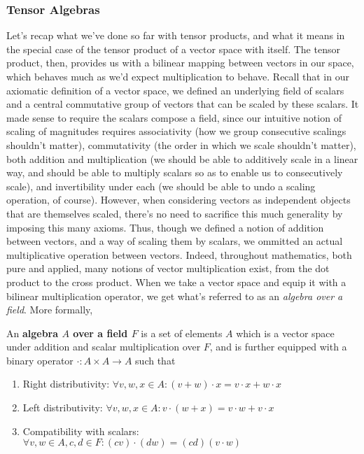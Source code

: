 \documentclass{article}
\newcommand{\n}{\leavevmode \newline}
\begin{document}
\subsubsection{Tensor Algebras}

Let's recap what we've done so far with tensor products, and what it means in the special case of the tensor product of a vector space with itself. The tensor product, then, provides us with a bilinear mapping between vectors in our space, which behaves much as we'd expect multiplication to behave. Recall that in our axiomatic definition of a vector space, we defined an underlying field of scalars and a central commutative group of vectors that can be scaled by these scalars. It made sense to require the scalars compose a field, since our intuitive notion of scaling of magnitudes requires associativity (how we group consecutive scalings shouldn't matter), commutativity (the order in which we scale shouldn't matter), both addition and multiplication (we should be able to additively scale in a linear way, and should be able to multiply scalars so as to enable us to consecutively scale), and invertibility under each (we should be able to undo a scaling operation, of course). However, when considering vectors as independent objects that are themselves scaled, there's no need to sacrifice this much generality by imposing this many axioms. Thus, though we defined a notion of addition between vectors, and a way of scaling them by scalars, we ommitted an actual multiplicative operation between vectors. Indeed, throughout mathematics, both pure and applied, many notions of vector multiplication exist, from the dot product to the cross product. When we take a vector space and equip it with a bilinear multiplication operator, we get what's referred to as an \textit{algebra over a field}. More formally,
\n
\begin{adjustwidth}{1cm}{1cm}
    An \textbf{algebra $ A $ over a field $ F $} is a set of elements $ A $ which is a vector space under addition and scalar multiplication over $ F $, and is further equipped with a binary operator $ \cdot: A \times A \rightarrow A $ such that
    \begin{enumerate}
        \item Right distributivity: $ \forall v, w, x \in A: (v + w) \cdot x = v \cdot x + w \cdot x $
        \item Left distributivity: $ \forall v, w, x \in A: v \cdot (w + x) = v \cdot w + v \cdot x $
        \item Compatibility with scalars: $ \forall v, w \in A, c, d \in F: (c v) \cdot (d w) = (c d) (v \cdot w) $
    \end{enumerate}
\end{adjustwidth}
\end{document}
